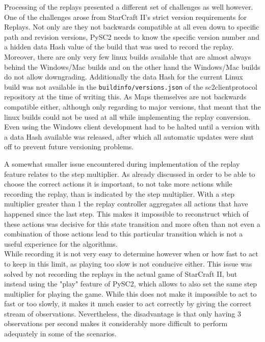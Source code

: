 Processing of the replays presented a different set of challenges as well however. One of the challenges arose from StarCraft II's strict version requirements for Replays. Not only are they not backwards compatible at all even down to specific path and revision versions, PySC2 needs to know the specific version number and a hidden data Hash value of the build that was used to record the replay. Moreover, there are only very few linux builds available that are almost always behind the Windows/Mac builds and on the other hand the Windows/Mac builds do not allow downgrading. Additionally the data Hash for the current Linux build was not available in the \lstinline{buildinfo/versions.json} of the sc2clientprotocol repository at the time of writing this. As Maps themselves are not backwards compatible either, although only regarding to major versions, that meant that the linux builds could not be used at all while implementing the replay conversion. Even using the Windows client development had to be halted until a version with a data Hash available was released, after which all automatic updates were shut off to prevent future versioning problems.

A somewhat smaller issue encountered during implementation of the replay feature relates to the step multiplier. As already discussed in order to be able to choose the correct actions it is important, to not take more actions while recording the replay, than is indicated by the step multiplier. With a step multiplier greater than 1 the replay controller aggregates all actions that have happened since the last step. This makes it impossible to reconstruct which of these actions was decisive for this state transition and more often than not even a combination of those actions lead to this particular transition which is not a useful experience for the algorithms. \\
While recording it is not very easy to determine however when or how fast to act to keep in this limit, as playing too slow is not conducive either. This issue was solved by not recording the replays in the actual game of StarCraft II, but instead using the "play" feature of PySC2, which allows to also set the same step multiplier for playing the game. While this does not make it impossible to act to fast or too slowly, it makes it much easier to act correctly by giving the correct stream of observations. Nevertheless, the disadvantage is that only having 3 observations per second makes it considerably more difficult to perform adequately in some of the scenarios.

